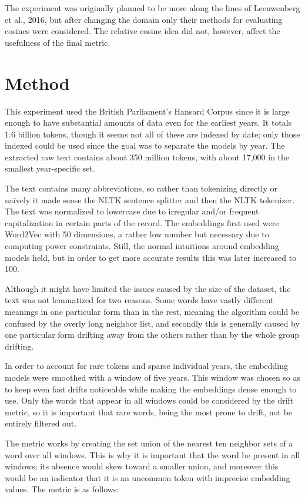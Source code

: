 \documentclass{article}
\begin{document}
The experiment was originally planned to be more along the lines of Leeuwenberg et al., 2016, but after changing the domain only their methods for evaluating cosines were considered. The relative cosine idea did not, however, affect the usefulness of the final metric.

\section{Method}
This experiment used the British Parliament's Hansard Corpus since it is large enough to have substantial amounts of data even for the earliest years. It totals 1.6 billion tokens, though it seems not all of these are indexed by date; only those indexed could be used since the goal was to separate the models by year. The extracted raw text contains about 350 million tokens, with about 17,000 in the smallest year-specific set.

The text contains many abbreviations, so rather than tokenizing directly or naïvely it made sense the NLTK sentence splitter and then the NLTK tokenizer. The text was normalized to lowercase due to irregular and/or frequent capitalization in certain parts of the record. The embeddings first used were Word2Vec with 50 dimensions, a rather low number but necessary due to computing power constraints. Still, the normal intuitions around embedding models held, but in order to get more accurate results this was later increased to 100.

Although it might have limited the issues caused by the size of the dataset, the text was not lemmatized for two reasons. Some words have vastly different meanings in one particular form than in the rest, meaning the algorithm could be confused by the overly long neighbor list, and secondly this is generally caused by one particular form drifting away from the others rather than by the whole group drifting.

In order to account for rare tokens and sparse individual years, the embedding models were smoothed with a window of five years. This window was chosen so as to keep even fast drifts noticeable while making the embeddings dense enough to use. Only the words that appear in all windows could be considered by the drift metric, so it is important that rare words, being the most prone to drift, not be entirely filtered out.

The metric works by creating the set union of the nearest ten neighbor sets of a word over all windows. This is why it is important that the word be present in all windows; its absence would skew toward a smaller union, and moreover this would be an indicator that it is an uncommon token with imprecise embedding values. The metric is as follows:
\end{document}
